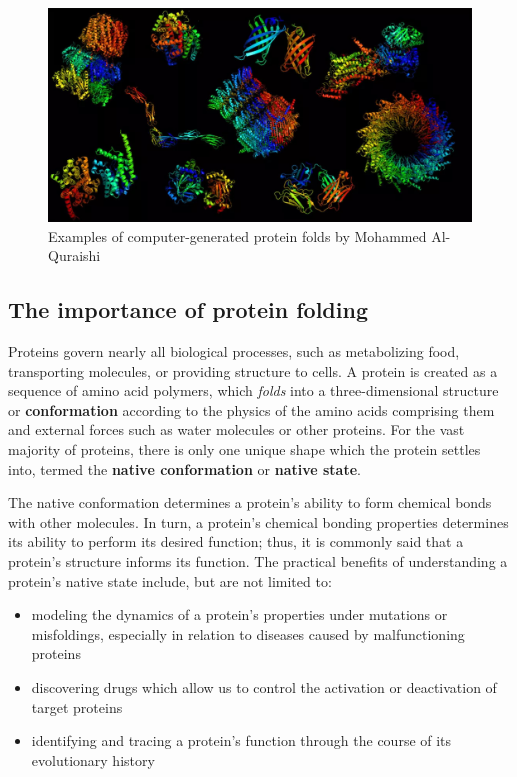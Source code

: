 \documentclass{article}
\begin{document}
\begin{figure}
  \includegraphics[width=\linewidth]{images/protein_folds.jpg}
  \caption{Examples of computer-generated protein folds by Mohammed Al-Quraishi}
  \label{fig:protein_folds}
\end{figure}

\subsection{The importance of protein folding}
Proteins govern nearly all biological processes, such as metabolizing food, transporting molecules, or providing structure to cells. A protein is created as a sequence of amino acid polymers, which \textit{folds} into a three-dimensional structure or \textbf{conformation} according to the physics of the amino acids comprising them and external forces such as water molecules or other proteins. For the vast majority of proteins, there is only one unique shape which the protein settles into, termed the \textbf{native conformation} or \textbf{native state}.

The native conformation determines a protein's ability to form chemical bonds with other molecules. In turn, a protein's chemical bonding properties determines its ability to perform its desired function; thus, it is commonly said that a protein's structure informs its function. The practical benefits of understanding a protein's native state include, but are not limited to:

\begin{itemize}
    \item modeling the dynamics of a protein's properties under mutations or misfoldings, especially in relation to diseases caused by malfunctioning proteins
    \item discovering drugs which allow us to control the activation or deactivation of target proteins
    \item identifying and tracing a protein's function through the course of its evolutionary history
\end{itemize}
\end{document}

